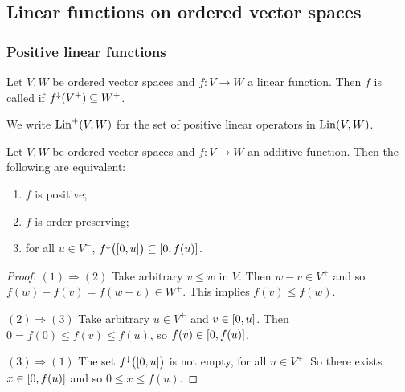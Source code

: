 \subsection{Linear functions on ordered vector spaces}
\subsubsection{Positive linear functions}
\begin{definition}
Let $V,W$ be ordered vector spaces and $f: V\to W$ a linear function. Then $f$ is called  if $f^\downarrow(V^+) \subseteq W^+$.

We write $\operatorname{Lin}^+(V,W)$ for the set of positive linear operators in $\operatorname{Lin}(V,W)$.
\end{definition}

\begin{lemma} \label{positiveLinearFunctionIsotone}
Let $V,W$ be ordered vector spaces and $f: V\to W$ an additive function. Then the following are equivalent:
\begin{enumerate}
\item $f$ is positive;
\item $f$ is order-preserving;
\item for all $u\in V^+$, $f^\imf\big(\interval{0,u}\big) \subseteq \interval{0,f(u)}$.
\end{enumerate}
\end{lemma}
\begin{proof}
$(1) \Rightarrow (2)$ Take arbitrary $v\leq w$ in $V$. Then $w-v \in V^+$ and so $f(w) - f(v) = f(w-v) \in W^+$. This implies $f(v)\leq f(w)$.

$(2) \Rightarrow (3)$ Take arbitrary $u\in V^+$ and $v\in \interval{0,u}$. Then $0 = f(0) \leq f(v) \leq f(u)$, so $f(v)\in \interval{0,f(u)}$.

$(3) \Rightarrow (1)$ The set $f^\imf\big(\interval{0,u}\big)$ is not empty, for all $u\in V^+$. So there exists $x\in \interval{0,f(u)}$ and so $0 \leq x \leq f(u)$.
\end{proof}

